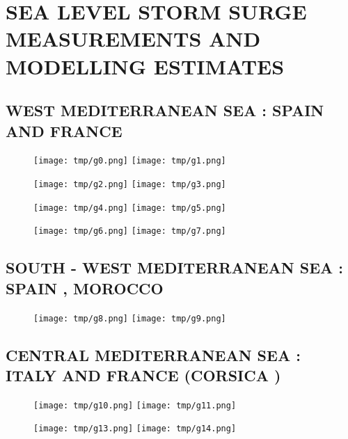 \documentclass[a4paper]{article}
\renewcommand{\\}{\ {\large\textperiodcentered}\ }
\renewcommand{\\}{\ {\large\textperiodcentered}\ }
\begin{document}
\newpage


\section*{SEA LEVEL STORM SURGE MEASUREMENTS AND MODELLING ESTIMATES}

\subsection*{WEST MEDITERRANEAN SEA : SPAIN AND FRANCE}

\begin{figure}[h]
\centerline{
\texttt{[image: tmp/g0.png]}
\texttt{[image: tmp/g1.png]}
}
\end{figure}

\begin{figure}[h]
\centerline{
\texttt{[image: tmp/g2.png]}
\texttt{[image: tmp/g3.png]}
}
\end{figure}

\begin{figure}[h]
\centerline{
\texttt{[image: tmp/g4.png]}
\texttt{[image: tmp/g5.png]}
}
\end{figure}

\begin{figure}[h]
\centerline{
\texttt{[image: tmp/g6.png]}
\texttt{[image: tmp/g7.png]}
}
\end{figure}

\clearpage

\subsection*{SOUTH - WEST MEDITERRANEAN SEA : SPAIN , MOROCCO}

\begin{figure}[h]
\centerline{
\texttt{[image: tmp/g8.png]}
\texttt{[image: tmp/g9.png]}
}
\end{figure}

\clearpage

\subsection*{CENTRAL MEDITERRANEAN SEA : ITALY AND FRANCE (CORSICA )}

\begin{figure}[h]
\centerline{
\texttt{[image: tmp/g10.png]}
\texttt{[image: tmp/g11.png]}
}
\end{figure}

\begin{figure}[h]
\centerline{
\texttt{[image: tmp/g13.png]}
\texttt{[image: tmp/g14.png]}
}
\end{figure}
\end{document}
